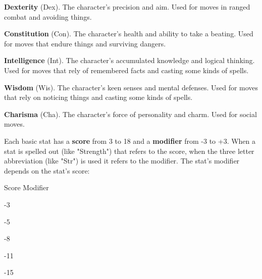        

         {\bf Dexterity}  (Dex). The character's precision and aim. Used for moves in ranged combat and avoiding things.

       

         {\bf Constitution}  (Con). The character's health and ability to take a beating. Used for moves that endure things and surviving dangers.

       

         {\bf Intelligence}  (Int). The character's accumulated knowledge and logical thinking. Used for moves that rely of remembered facts and casting some kinds of spells.

       

         {\bf Wisdom}  (Wis). The character's keen senses and mental defenses. Used for moves that rely on noticing things and casting some kinds of spells.

       

         {\bf Charisma}  (Cha). The character's force of personality and charm. Used for social moves.

       

Each basic stat has a {\bf score}  from 3 to 18 and a {\bf modifier}  from -3 to +3. When a stat is spelled out (like "Strength") that refers to the score, when the three letter abbreviation (like "Str") is used it refers to the modifier. The stat's modifier depends on the stat's score:

\bTABLE
 		
\bTR
\bTH
 			Score 			
\eTH
\bTH
Modifier
\eTH
 		
\eTR
 		
\bTR

-3
\eTD

\eTD

\eTR
 		
\bTR

-5
\eTD

\eTD

\eTR
 		
\bTR

-8
\eTD

\eTD

\eTR
 		
\bTR

-11
\eTD

\eTD

\eTR
 		
\bTR

-15
\eTD

